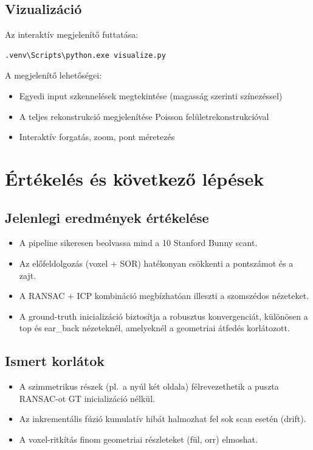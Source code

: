 \documentclass[12pt,a4paper]{article}
\begin{document}
\subsection{Vizualizáció}

Az interaktív megjelenítő futtatása:
\begin{lstlisting}[language=bash]
.venv\Scripts\python.exe visualize.py
\end{lstlisting}

A megjelenítő lehetőségei:
\begin{itemize}[nosep]
    \item Egyedi input szkennelések megtekintése (magasság szerinti színezéssel)
    \item A teljes rekonstrukció megjelenítése Poisson felületrekonstrukcióval
    \item Interaktív forgatás, zoom, pont méretezés
\end{itemize}

\section{Értékelés és következő lépések}

\subsection{Jelenlegi eredmények értékelése}

\begin{itemize}
    \item A pipeline sikeresen beolvassa mind a 10 Stanford Bunny scant.
    \item Az előfeldolgozás (voxel + SOR) hatékonyan csökkenti a pontszámot és a zajt.
    \item A RANSAC + ICP kombináció megbízhatóan illeszti a szomszédos nézeteket.
    \item A ground-truth inicializáció biztosítja a robusztus konvergenciát, különösen a top és ear\_back nézeteknél, amelyeknél a geometriai átfedés korlátozott.
\end{itemize}

\subsection{Ismert korlátok}

\begin{itemize}
    \item A szimmetrikus részek (pl.\ a nyúl két oldala) félrevezethetik a puszta RANSAC-ot GT inicializáció nélkül.
    \item Az inkrementális fúzió kumulatív hibát halmozhat fel sok scan esetén (drift).
    \item A voxel-ritkítás finom geometriai részleteket (fül, orr) elmoshat.
\end{itemize}
\end{document}
